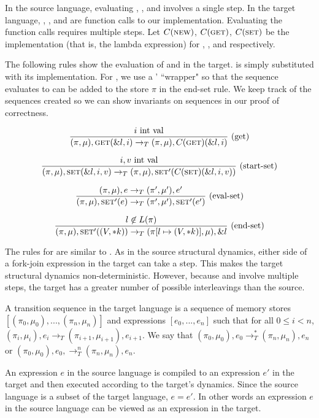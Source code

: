 In the source language, evaluating \new{}, \get{}, and \set{} involves a single step. In the target language, \new{}, \get{}, and \set{} are function calls to our implementation. Evaluating the function calls requires multiple steps. Let $C(\text{{\sc new}}{})$, $C(\text{{\sc get}}{})$, $C(\text{{\sc set}}{})$ be the implementation (that is, the lambda expression) for \new{}, \get{}, and \set{} respectively. 

The following rules show the evaluation of \get{} and \set{} in the target. \get{} is simply substituted with its implementation. For \set{}, we use a \set{}' ``wrapper" so that the sequence \set{} evaluates to can be added to the store $\pi$ in the end-set rule. We keep track of the sequences created so we can show invariants on sequences in our proof of correctness.

$$\frac{i \text{ int val}}{(\pi, \mu), \text{{\sc get}}{}(\&l, i) \to_T (\pi, \mu), C(\text{{\sc get}}{})(\&l, i)} \text{ (get)}$$

$$\frac{i, v \text{ int val}}{(\pi,\mu), \text{{\sc set}{}}(\&l, i, v) \to_T (\pi, \mu), \text{{\sc set}{}}'(C(\text{{\sc set}{}})(\&l, i, v))} \text{ (start-set)}$$

$$\frac{(\pi, \mu), e \to_T (\pi',\mu'), e'}{(\pi,\mu), \text{{\sc set}{}}'(e) \to_T (\pi',\mu'), \text{{\sc set}{}}'(e')} \text{ (eval-set)}$$

$$\frac{l \not\in L(\pi)}{(\pi, \mu), \text{{\sc set}{}}'((V,*k)) \to_T (\pi[l \mapsto (V, *k)], \mu), \&l} \text{ (end-set)}$$

The rules for \new{} are similar to \set{}. As in the source structural dynamics, either side of a fork-join expression in the target can take a step. This makes the target structural dynamics non-deterministic. However, because \get{} and \set{} involve multiple steps, the target has a greater number of possible interleavings than the source.

\begin{definition}
A transition sequence in the target language is a sequence of memory stores $[(\pi_0, \mu_0), ..., (\pi_n, \mu_n)]$ and expressions $[e_0, ..., e_n]$ such that for all $0 \leq i < n$, $(\pi_i, \mu_i), e_i \to_T (\pi_{i+1}, \mu_{i+1}), e_{i+1}$. We say that $(\pi_0, \mu_0), e_0 \to^*_T (\pi_n, \mu_n), e_n$ or $(\pi_0, \mu_0), e_0, \to^n_T (\pi_n, \mu_n), e_n$.
\end{definition}

An expression $e$ in the source language is compiled to an expression $e'$ in the target and then executed according to the target's dynamics. Since the source language is a subset of the target language, $e = e'$. In other words an expression $e$ in the source language can be viewed as an expression in the target.

